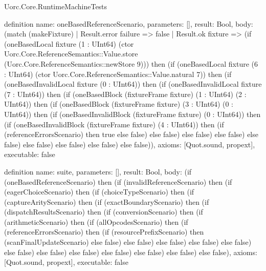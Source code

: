 \begin{lexlean}{Uorc.Core.RuntimeMachineTests}
\begin{semanticmodule}
definition{
  name: oneBasedReferenceScenario,
  parameters: [],
  result: Bool,
  body: (match (makeFixture)
    | Result.error failure => false
    | Result.ok fixture => (if (oneBasedLocal fixture (1 : UInt64) (ctor Uorc.Core.ReferenceSemantics::Value.store (Uorc.Core.ReferenceSemantics::newStore 9))) then (if (oneBasedLocal fixture (6 : UInt64) (ctor Uorc.Core.ReferenceSemantics::Value.natural 7)) then (if (oneBasedInvalidLocal fixture (0 : UInt64)) then (if (oneBasedInvalidLocal fixture (7 : UInt64)) then (if (oneBasedBlock (fixtureFrame fixture) (1 : UInt64) (2 : UInt64)) then (if (oneBasedBlock (fixtureFrame fixture) (3 : UInt64) (0 : UInt64)) then (if (oneBasedInvalidBlock (fixtureFrame fixture) (0 : UInt64)) then (if (oneBasedInvalidBlock (fixtureFrame fixture) (4 : UInt64)) then (if (referenceErrorsScenario) then true else false) else false) else false) else false) else false) else false) else false) else false) else false)),
  axioms: [Quot.sound, propext],
  executable: false
}

definition{
  name: suite,
  parameters: [],
  result: Bool,
  body: (if (oneBasedReferenceScenario) then (if (invalidReferenceScenario) then (if (eagerChoiceScenario) then (if (choiceTypeScenario) then (if (captureArityScenario) then (if (exactBoundaryScenario) then (if (dispatchResultsScenario) then (if (conversionScenario) then (if (arithmeticScenario) then (if (allOpcodesScenario) then (if (referenceErrorsScenario) then (if (resourcePrefixScenario) then (scanFinalUpdateScenario) else false) else false) else false) else false) else false) else false) else false) else false) else false) else false) else false) else false),
  axioms: [Quot.sound, propext],
  executable: false
}
\end{semanticmodule}
\end{lexlean}
